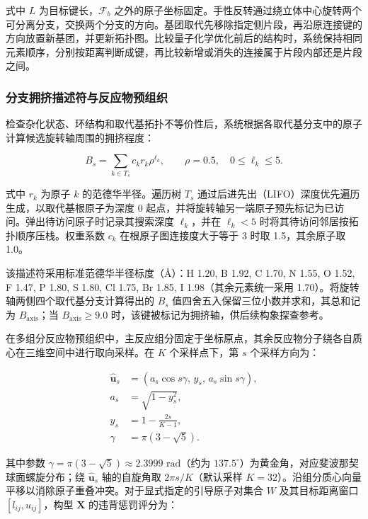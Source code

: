 式中 $L$ 为目标键长，$\mathcal{F}_b$ 之外的原子坐标固定。手性反转通过绕立体中心旋转两个可分离分支，交换两个分支的方向。基团取代先移除指定侧片段，再沿原连接键的方向放置新基团，并更新拓扑图。比较量子化学优化前后的结构时，系统保持相同元素顺序，分别按距离判断成键，再比较新增或消失的连接属于片段内部还是片段之间。

\subsubsection{分支拥挤描述符与反应物预组织}
检查杂化状态、环结构和取代基拓扑不等价性后，系统根据各取代基分支中的原子计算候选旋转轴周围的拥挤程度：

\begin{equation}\label{eq:methods-04}
B_s=\sum_{k\in T_s} c_k r_k \rho^{\ell_k},\qquad\rho=0.5,\quad 0\le \ell_k\le 5.
\end{equation}

式中 $r_k$ 为原子 $k$ 的范德华半径。遍历树 $T_s$ 通过后进先出（LIFO）深度优先遍历生成，以取代基根原子为深度 0 起点，并将旋转轴另一端原子预先标记为已访问。弹出待访问原子时记录其搜索深度 $\ell_k$，并在 $\ell_k<5$ 时将其待访问邻居按拓扑顺序压栈。权重系数 $c_k$ 在根原子图连接度大于等于 3 时取 1.5，其余原子取 1.0。

该描述符采用标准范德华半径标度（Å）：H 1.20, B 1.92, C 1.70, N 1.55, O 1.52, F 1.47, P 1.80, S 1.80, Cl 1.75, Br 1.85, I 1.98（其余元素统一采用 1.70）。将旋转轴两侧四个取代基分支计算得出的 $B_s$ 值四舍五入保留三位小数并求和，其总和记为 $B_{\mathrm{axis}}$；当 $B_{\mathrm{axis}}\ge 9.0$ 时，该键被标记为拥挤轴，供后续构象探查参考。

在多组分反应物预组织中，主反应组分固定于坐标原点，其余反应物分子绕各自质心在三维空间中进行取向采样。在 $K$ 个采样点下，第 $s$ 个采样方向为：

\begin{equation}\label{eq:methods-05}
\begin{aligned}
\hat{\mathbf{u}}_s&=(a_s\cos s\gamma,\,y_s,\,a_s\sin s\gamma),\\
a_s&=\sqrt{1-y_s^2},\\
y_s&=1-\frac{2s}{K-1},\\
\gamma&=\pi(3-\sqrt{5}).
\end{aligned}
\end{equation}

其中参数 $\gamma=\pi(3-\sqrt{5})\approx 2.3999\text{ rad}$（约为 $137.5^\circ$）为黄金角，对应斐波那契球面螺旋分布；绕 $\hat{\mathbf{u}}_s$ 轴的自旋角取 $2\pi s/K$（默认采样 $K=32$）。沿组分质心向量平移以消除原子重叠冲突。对于显式指定的引导原子对集合 $W$ 及其目标距离窗口 $[l_{ij},u_{ij}]$，构型 $\mathbf{X}$ 的违背惩罚评分为：

